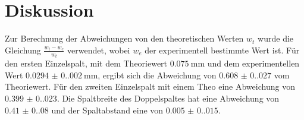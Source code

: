 \section{Diskussion}

Zur Berechnung der Abweichungen von den theoretischen Werten $w_t$ wurde die Gleichung $\frac{w_t-w_e}{w_t}$ verwendet, wobei $w_e$ der experimentell bestimmte Wert ist. Für den ersten Einzelspalt, mit dem Theoriewert $\qty{0.075}{\milli\meter}$
und dem experimentellen Wert $\qty{0.0294(0.0020)}{\milli\meter}$, ergibt sich die Abweichung von $\qty{0.608(0.027)}$ vom Theoriewert. Für den zweiten Einzelspalt mit einem Theo eine Abweichung von $\qty{0.399(0.023)}$.
Die Spaltbreite des Doppelspaltes hat eine Abweichung von $\qty{0.41(0.08)}$ und der Spaltabstand eine von $\qty{0.005(0.015)}$.

\label{sec:Diskussion}
